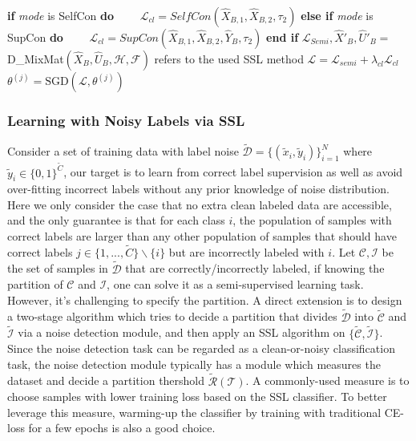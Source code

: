 \documentclass[letterpaper]{article} \usepackage{aaai22}  \usepackage{times}  \usepackage{helvet}  \usepackage{courier}  \usepackage[hyphens]{url}  \usepackage{graphicx} \usepackage{subfigure}
\begin{document}
\begin{algorithm}[!h]
\begin{algorithmic}[1]
\STATE \textbf{if} \textit{mode} is SelfCon \textbf{do}
    \STATE \ \ \ \ $\mathcal{L}_{cl}= SelfCon(\hat{X}_{B,1},\hat{X}_{B,2}, \tau_2)$
    \STATE \textbf{else if} \textit{mode} is SupCon \textbf{do}
    \STATE \ \ \ \ $\mathcal{L}_{cl}= SupCon(\hat{X}_{B,1},\hat{X}_{B,2}, \hat{Y}_B, \tau_2)$
    \STATE \textbf{end if}
    \STATE $\mathcal{L}_{Semi}, \hat{X}'_B, \hat{U}'_B= $D\_MixMat$(\hat{X}_B, \hat{U}_B, \mathcal{H}, \mathcal{F})$
    \STATE {} refers to the used SSL method
    \STATE $\mathcal{L}= \mathcal{L}_{semi} + \lambda_{cl}\mathcal{L}_{cl}$ 
    \STATE $\theta^{(j)}=\text{SGD}(\mathcal{L}, \theta^{(j)})$    
    \ENDFOR
    \ENDWHILE
\ENDWHILE
\end{algorithmic}
\label{alg:ALG2}
\end{algorithm}
\subsubsection{Learning with Noisy Labels via SSL}
Consider a set of training data with label noise $\tilde{\mathcal{D}}= \{(\tilde{x}_{i}, \tilde{y}_{i})\}_{i=1}^{N}$ where $\tilde{y}_i \in \{0,1\}^{\tilde{C}}$, our target is to learn from correct label supervision as well as avoid over-fitting incorrect labels without any prior knowledge of noise distribution. Here we only consider the case that no extra clean labeled data are accessible, and the only guarantee is that for each class $i$, the population of samples with correct labels are larger than any other population of samples that should have correct labels $j \in \{1,...,\tilde{C}\} \backslash \{i\}$ but are incorrectly labeled with $i$. Let $\mathcal{C}, \mathcal{I}$ be the set of samples in $\mathcal{\tilde{D}}$ that are correctly/incorrectly labeled, if knowing the partition of $\mathcal{C}$ and $\mathcal{I}$, one can solve it as a semi-supervised learning task. However, it's challenging to specify the partition. A direct extension is to design a two-stage algorithm which tries to decide a partition that divides $\mathcal{\tilde{D}}$ into $\mathcal{\tilde{C}}$ and $\mathcal{\tilde{I}}$ via a noise detection module, and then apply an SSL algorithm on $\{\mathcal{\tilde{C}}, \mathcal{\tilde{I}}\}$. Since the noise detection task can be regarded as a clean-or-noisy classification task, the noise detection module typically has a module which measures the dataset and decide a partition thershold $\mathcal{\tilde{R}}(\mathcal{T})$. A commonly-used measure is to choose samples with lower training loss based on the SSL classifier. To better leverage this measure, warming-up the classifier by training with traditional CE-loss for a few epochs is also a good choice.
\end{document}
